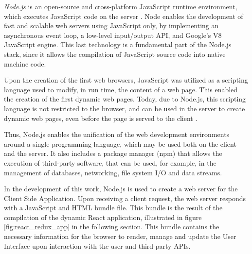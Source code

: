 \textit{Node.js} \cite{nodejs} is an open-source and cross-platform JavaScript runtime environment, which executes JavaScript code on the server \cite{node_article}. Node enables the development of fast and scalable web servers using JavaScript only, by implementing an asynchronous event loop, a low-level input/output API, and Google's V8 JavaScript engine. This last technology is a fundamental part of the Node.js stack, since it allows the compilation of JavaScript source code into native machine code. 

Upon the creation of the first web browsers, JavaScript was utilized as a scripting language used to modify, in run time, the content of a web page. This enabled the creation of the first dynamic web pages. Today, due to Node.js, this scripting language is not restricted to the browser, and can be used in the server to create dynamic web pages, even before the page is served to the client \cite{node_book}. 

Thus, Node.js enables the unification of the web development environments around a single programming language, which may be used both on the client and the server. It also includes a package manager (npm) that allows the execution of third-party software, that can be used, for example, in the management of databases, networking, file system I/O and data streams.

In the development of this work, Node.js is used to create a web server for the Client Side Application. Upon receiving a client request, the web server responds with a JavaScript and \ac{HTML} bundle file. This bundle is the result of the compilation of the dynamic React application, illustrated in figure \ref{fig:react_redux_app} in the following section. This bundle contains the necessary information for the browser to render, manage and update the User Interface upon interaction with the user and third-party APIs.
